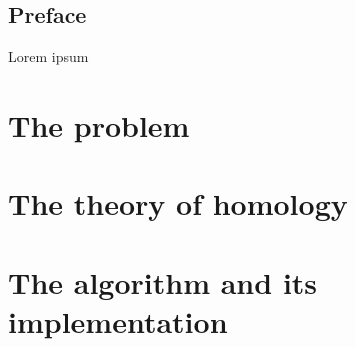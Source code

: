\documentclass[12pt]{book}
\title{}
\author{Arnau Mas}
\date{}
\begin{document}
\maketitle
\thispagestyle{empty}

\pagestyle{plain}
\frontmatter
{ \small \tableofcontents }

\pagebreak
{}
\section*{Preface}
Lorem ipsum

\mainmatter
\pagestyle{main}

\chapter{The problem}\label{ch:problem}


\chapter{The theory of homology}


\chapter{The algorithm and its implementation}


\backmatter
\printbibliography
\end{document}

